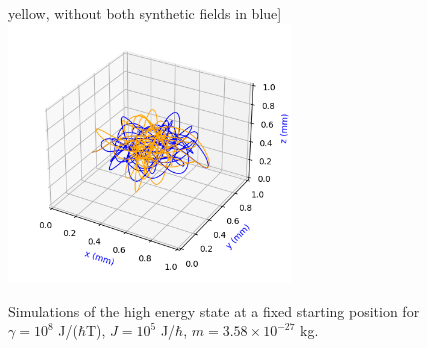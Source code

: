 \documentclass[main.tex]{subfiles}
\begin{document}
\begin{figure}[h]
    yellow, without both synthetic fields in blue]{{\includegraphics[width=7.5cm]{figures/n2m-27/(1,1)-comp6}}}
    \caption{\centering Simulations of the high energy state at a fixed starting position for \(\gamma
    = 10^{8}\) J/(\(\hbar{}\)T), \(J= 10^{5}\) J/\(\hbar{}\), \(m = 3.58\times 10^{-27}\) kg.}%
    \label{fig:n2m-27B}
\end{figure}
\end{document}
